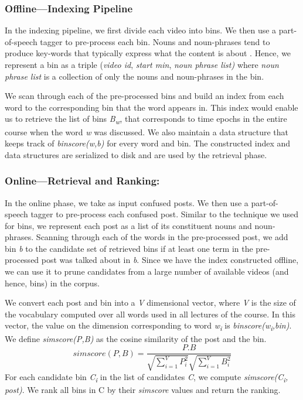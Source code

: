 \documentclass{edm_template}
\begin{document}
\subsubsection{Offline---Indexing Pipeline}
In the indexing pipeline, we first divide each video into bins. We then use a part-of-speech tagger \cite{nltk} to pre-process each bin. Nouns and noun-phrases tend to produce key-words that typically express what the content is about \cite{hulth2003improved}. Hence, we represent a bin as a triple (\textit{video \textunderscore id}, \textit{start \textunderscore min}, \textit{noun \textunderscore phrase \textunderscore list)} where \textit{noun \textunderscore phrase \textunderscore list} is a collection of only the nouns and noun-phrases in the bin.

We scan through each of the pre-processed bins and build an index from each word to the corresponding bin that the word appears in. This index would enable us to retrieve the list of bins \textit{B\textsubscript{w}}, that corresponds to time epochs in the entire course when the word \textit{w} was discussed. We also maintain a data structure that keeps track of \textit{bin\textunderscore score(w,b)} for every word and bin. The constructed index and data structures are serialized to disk and are used by the retrieval phase.

\subsubsection{Online---Retrieval and Ranking:}
In the online phase, we take as input confused posts. We then use a part-of-speech tagger \cite{nltk} to pre-process each confused post. Similar to the technique we used for bins, we represent each post as a list of its constituent nouns and noun-phrases. Scanning through each of the words in the pre-processed post, we add bin \textit{b} to the candidate set of retrieved bins if at least one term in the pre-processed post was talked about in \textit{b}. Since we have the index constructed offline, we can use it to prune candidates from a large number of available videos (and hence, bins) in the corpus.

We convert each post and bin into a \textit{V} dimensional vector, where \textit{V} is the size of the vocabulary computed over all words used in all lectures of the course. In this vector, the value on the dimension corresponding to word  \textit{w\textsubscript i} is \textit{binscore(w\textsubscript i,bin)}. We define \textit{simscore(P,B)} as the cosine similarity of the post and the bin.
\begin{equation}
simscore(P,B) = \frac{P.B}{\sqrt{\sum\limits_{i=1}^V P_i ^2} \sqrt{\sum\limits_{i=1}^V B_i ^2}  }
\end{equation}
For each candidate bin \textit{C\textsubscript i} in the list of candidates \textit{C}, we compute \textit{simscore(C\textsubscript i, post)}. We rank all bins in C by their \textit{simscore} values and return the ranking.
\end{document}
